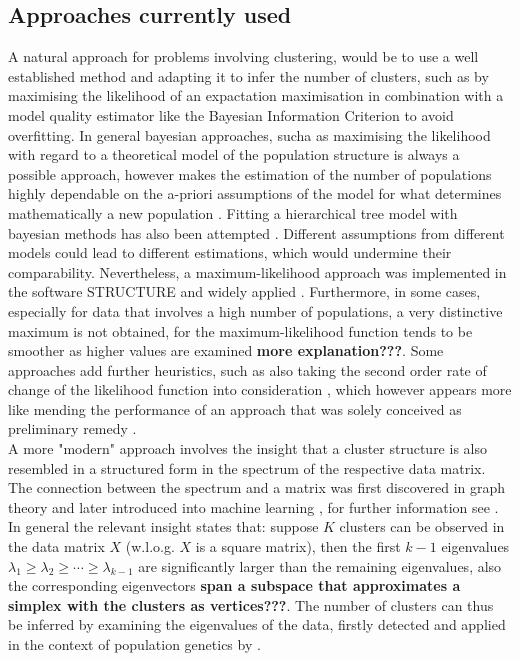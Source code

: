 \documentclass[a4paper, 11pt]{article}
\begin{document}
\subsection{Approaches currently used}
A natural approach for problems involving clustering, would be to use a well established method and adapting it to infer the number of clusters, such as by maximising the likelihood of an expactation maximisation in combination with a model quality estimator like the Bayesian Information Criterion to avoid overfitting. In general bayesian approaches, sucha as maximising the likelihood with regard to a theoretical model of the population structure is always a possible approach, however makes the estimation of the number of populations highly dependable on the a-priori assumptions of the model for what determines mathematically a new population \cite{falush2003inference}. Fitting a hierarchical tree model with bayesian methods has also been attempted \cite{corander2004baps}. Different assumptions from different models could lead to different estimations, which would undermine their comparability. Nevertheless, a maximum-likelihood approach was implemented in the software STRUCTURE \cite{pritchard2000inference} \cite{falush2003inference} and widely applied \cite{rosenberg2002genetic} \cite{harter2004origin} \cite{rosenberg2001empirical}. Furthermore, in some cases, especially for data that involves a high number of populations, a very distinctive maximum is not obtained, for the maximum-likelihood function tends to be smoother as higher values are examined \textbf{more explanation???}. Some approaches add further heuristics, such as also taking the second order rate of change of the likelihood function into consideration \cite{evanno2005detecting}, which however appears more like mending the performance of an approach that was solely conceived as preliminary remedy \cite{pritchard2000inference}.\\
A more "modern" approach involves the insight that a cluster structure is also resembled in a structured form in the spectrum of the respective data matrix. The connection between the spectrum and a matrix was first discovered in graph theory \cite{donath1973lower} \cite{fiedler1973algebraic} and later introduced into machine learning \cite{shi2000normalized} \cite{meila2001random} \cite{ng2002spectral}, for further information see \cite{von2007tutorial}. In general the relevant insight states that: suppose $K$ clusters can be observed in the data matrix $X$ (w.l.o.g. $X$ is a square matrix), then the first $k-1$ eigenvalues $\lambda_1 \geq \lambda_2 \geq \cdots \geq \lambda_{k-1}$ are significantly larger than the remaining eigenvalues, also the corresponding eigenvectors \textbf{span a subspace that approximates a simplex with the clusters as vertices???}. The number of clusters can thus be inferred by examining the eigenvalues of the data, firstly detected and applied in the context of population genetics by \cite{patterson2006population}. 
\end{document}
